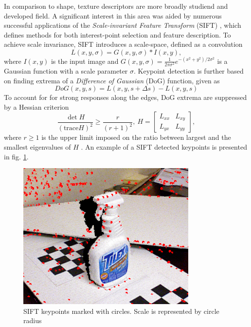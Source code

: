 In comparison to shape, texture descriptors are more broadly studiend and developed field. A significant interest in this area was aided by numerous successful applications \cite{ORB} of the \textit{Scale-invariant Feature Transform} (SIFT) \cite{SIFT}, which defines methods for both interest-point selection and feature description. To achieve scale invariance, SIFT introduces a scale-space, defined as a convolution
\begin{equation}
L(x,y,\sigma) = G(x,y,\sigma) \ast I(x,y),
\end{equation}
where $I(x,y)$ is the input image and $G(x,y,\sigma) = \frac{1}{2\pi\sigma^2}e^{-(x^2 + y^2)/2\sigma^2}$ is a Gaussian function with a scale parameter $\sigma$. Keypoint detection is further based on finding extrema of a \textit{Difference of Gaussian} (DoG) function, given as
\begin{equation}
DoG(x,y,s) = L(x,y,s + \Delta s) - L(x,y,s)
\end{equation}
To account for for strong responses along the edges, DoG extrema are suppressed by a Hessian criterion
\begin{equation}
\frac{\det H}{(\mathrm{trace} H)^2} \geq \frac{r}{(r+1)^2},\ H = \begin{bmatrix}
L_{xx} & L_{xy} \\
L_{yx} & L_{yy} 
\end{bmatrix},
\end{equation}
where $r \geq 1$ is the upper limit imposed on the ratio between largest and the smallest eigenvalues of $H$ \cite{SiftScholarpedia}. An example of a SIFT detected keypoints is presented in fig. \ref{fig:sift}.

\begin{figure}[ht]
\centering
\includegraphics[width=0.8\textwidth]{fig/ISS}
\caption{SIFT keypoints marked with circles. Scale is represented by circle radius}
\label{fig:sift}
\end{figure}

